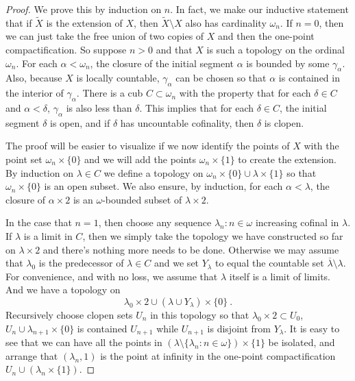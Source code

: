 \documentclass[11pt]{article}
\begin{document}
            \begin{proof}
            We prove this by induction on $n$.
            In fact, we make our inductive statement that  if $\tilde X$
            is the extension of $X$, then  $\tilde X \setminus X$ also
            has cardinality $\omega_n$.
             If $n=0$,
              then we can just take the free union of two copies of $X$
              and then the one-point compactification.
             So suppose $n>0$ and
            that $X$ is such a topology on the ordinal $\omega_n$.
            For each $\alpha<\omega_n$, the closure of the initial
            segment $\alpha$ is bounded by some $\gamma_\alpha$.
            Also, because $X$ is locally countable, $\gamma_\alpha$
            can be chosen so that $\alpha$ is contained  in the interior
            of $\gamma_\alpha$. There is a cub  $C\subset \omega_n$
            with the property that for each $\delta\in C$ and $\alpha<\delta$,
             $\gamma_\alpha$ is also less than $\delta$. This implies
             that for each $\delta\in C$, the initial segment $\delta$ is
             open, and if $\delta$ has uncountable cofinality, then
              $\delta$ is clopen.

              The proof will be easier to visualize if we now
              identify the points of $X$ with the point set
               $\omega_n\times \{0\}$ and we will add the points
                $\omega_n\times \{1\}$ to create the extension.
             By induction on $\lambda \in C$ we define a topology
             on $\omega_n\times\{0\}\cup \lambda\times \{1\}$ so that
             $\omega_n \times \{0\}$ is an open subset. We also ensure,
             by induction, for each $\alpha<\lambda$,
             the closure of $\alpha\times 2$ is an
              $\omega$-bounded  subset of $\lambda\times 2$.

          In the case that $n=1$, then  choose any sequence
           $\lambda_n : n\in \omega$ increasing cofinal in $\lambda$.
           If $\lambda $ is a limit in $C$, then we simply take the
           topology we have constructed so far on $\lambda\times 2$
           and there's nothing more needs to be done. Otherwise
          we may assume that $\lambda_0$ is the predecessor
          of $\lambda\in C$ and
           we set $Y_\lambda $ to equal the countable set
            $\overline{\lambda}\setminus \lambda$. For convenience,
             and with no loss, we assume that $\lambda$ itself is a limit
             of limits.
           And we have a topology on
           $$\lambda_0\times 2 \cup (\lambda \cup Y_\lambda)\times\{0\}~.$$
            Recursively
            choose clopen sets $U_n$ in this topology
             so that $\lambda_0\times 2\subset U_0$,
             $U_{n}\cup \lambda_{n+1}\times \{0\}$ is contained
              $ U_{n+1}$ while $U_{n+1}$ is disjoint from $Y_\lambda$.
              It is easy to see that we can have all the points
              in $(\lambda\setminus \{\lambda_n : n\in\omega\})\times \{1\}$
              be isolated, and arrange that $(\lambda_n,1) $ is the
              point at infinity in the one-point compactification
              $U_n\cup (\lambda_n\times \{1\})$.


\end{proof}
\end{document}
